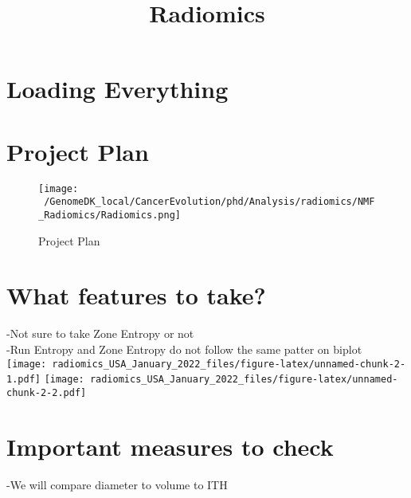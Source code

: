 \documentclass[]{article}
\title{Radiomics}
\author{}
\date{\vspace{-2.5em}}
\newenvironment{Shaded}{\begin{snugshade}}{\end{snugshade}}
\newcommand{\KeywordTok}[1]{\textcolor[rgb]{0.13,0.29,0.53}{\textbf{#1}}}
\newcommand{\StringTok}[1]{\textcolor[rgb]{0.31,0.60,0.02}{#1}}
\newcommand{\OperatorTok}[1]{\textcolor[rgb]{0.81,0.36,0.00}{\textbf{#1}}}
\newcommand{\NormalTok}[1]{#1}
\begin{document}
\maketitle

\section{Loading Everything}\label{loading-everything}

\section{Project Plan}\label{project-plan}

\begin{figure}
\centering
\texttt{[image: ~/GenomeDK\_local/CancerEvolution/phd/Analysis/radiomics/NMF\_Radiomics/Radiomics.png]}
\caption{Project Plan}
\end{figure}

\section{What features to take?}\label{what-features-to-take}

-Not sure to take Zone Entropy or not\\
-Run Entropy and Zone Entropy do not follow the same patter on biplot\\
\texttt{[image: radiomics\_USA\_January\_2022\_files/figure-latex/unnamed-chunk-2-1.pdf]}
\texttt{[image: radiomics\_USA\_January\_2022\_files/figure-latex/unnamed-chunk-2-2.pdf]}

\section{Important measures to check}\label{important-measures-to-check}

-We will compare diameter to volume to ITH\\

\begin{Shaded}
\end{Shaded}
\end{document}
